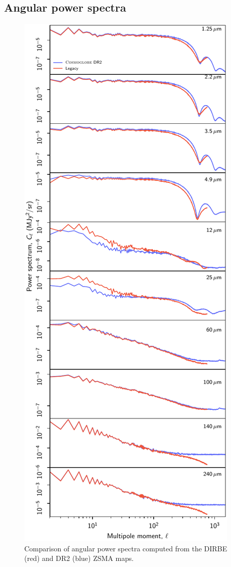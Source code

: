 \documentclass{aa}
\begin{document}
\subsection{Angular power spectra}

\begin{figure}
	\centering
	\includegraphics[width=\columnwidth]{figs/cls_DR2_vs_DIRBE_v2.pdf}
	\caption{Comparison of angular power spectra computed from the DIRBE (red) and DR2 (blue) ZSMA maps.}
	\label{fig:powspec}
\end{figure}
\end{document}
